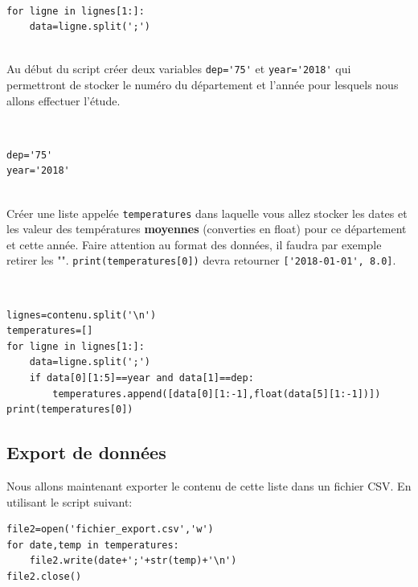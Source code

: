 \begin{solution}~\ \\
\begin{verbatim}
for ligne in lignes[1:]:
    data=ligne.split(';')
\end{verbatim}
\end{solution}

\begin{exercice}~\\
Au début du script créer deux variables \verb?dep='75'? et \verb?year='2018'? qui permettront de stocker le numéro du département et l'année pour lesquels nous allons effectuer l'étude.
\end{exercice}

\begin{solution}~\ \\
\begin{verbatim}
dep='75'
year='2018'
\end{verbatim}
\end{solution}

\begin{exercice}~\\
Créer une liste appelée \verb?temperatures? dans laquelle vous allez stocker les dates et les valeur des températures \textbf{moyennes} (converties en float) pour ce département et cette année. Faire attention au format des données, il faudra par exemple retirer les "". \verb?print(temperatures[0])? devra retourner \verb?['2018-01-01', 8.0]?.
\end{exercice}

\begin{solution}~\ \\
\begin{verbatim}
lignes=contenu.split('\n')
temperatures=[]
for ligne in lignes[1:]:
    data=ligne.split(';')
    if data[0][1:5]==year and data[1]==dep:
        temperatures.append([data[0][1:-1],float(data[5][1:-1])])
print(temperatures[0])
\end{verbatim}
\end{solution}

\subsection{Export de données}

Nous allons maintenant exporter le contenu de cette liste dans un fichier CSV. En utilisant le script suivant:

\begin{verbatim}
file2=open('fichier_export.csv','w')
for date,temp in temperatures:
    file2.write(date+';'+str(temp)+'\n')
file2.close()
\end{verbatim}

